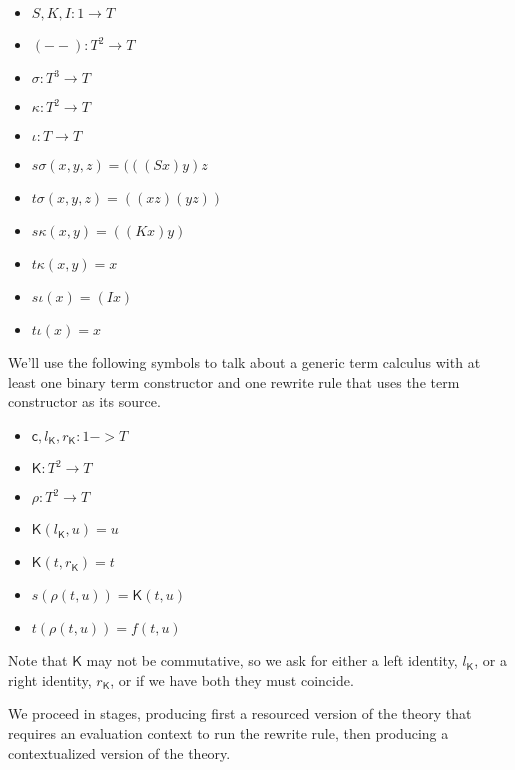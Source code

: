 \documentclass{llncs}
\renewcommand{\:}{\colon}
\begin{document}
\begin{itemize}
  \item $S, K, I : 1 \rightarrow T$
  \item $(- -) : T^{2} \rightarrow T$
  \item $\sigma : T^{3} \rightarrow T$
  \item $\kappa : T^{2} \rightarrow T$
  \item $\iota : T \rightarrow T$
  \item $s\sigma(x, y, z) = (((S x) y) z$
  \item $t\sigma(x, y, z) = ((x z) (y z))$
  \item $s\kappa(x, y) = ((K x) y)$
  \item $t\kappa(x, y) = x$
  \item $s\iota(x) = (I x)$
  \item $t\iota(x) = x$
\end{itemize}

We'll use the following symbols to talk about a generic term calculus
with at least one binary term constructor and one rewrite rule that
uses the term constructor as its source.

\begin{itemize}
  \item $\mathsf{c}, l_{\mathsf{K}}, r_{\mathsf{K}} : 1 -> T$
  \item $\mathsf{K} : T^{2} \rightarrow T$
  \item $\rho : T^{2} \rightarrow T$             %
  \item $\mathsf{K}(l_{\mathsf{K}}, u) = u$
  \item $\mathsf{K}(t, r_{\mathsf{K}}) = t$
  \item $s(\rho(t,u)) = \mathsf{K}(t, u)$
  \item $t(\rho(t,u)) = f(t,u)$
\end{itemize}

Note that $\mathsf{K}$ may not be commutative, so we ask for either a left
identity, $l_{\mathsf{K}}$, or a right identity, $r_{\mathsf{K}}$, or if we have both they must
coincide.

We proceed in stages, producing first a resourced version of the
theory that requires an evaluation context to run the rewrite rule,
then producing a contextualized version of the theory.
\end{document}
